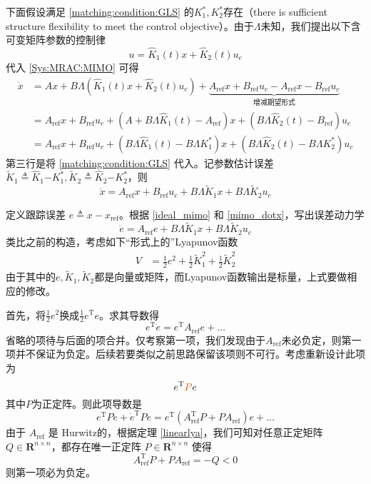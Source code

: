 下面假设满足 \eqref{matching:condition:GLS} 的$K^{\ast}_1, K^{\ast}_2$存在（there is sufficient structure flexibility to meet the control
objective）。由于$\Lambda$未知，我们提出以下含可变矩阵参数的控制律
\[ u = \hat{K}_1 (t) x + \hat{K}_2 (t) u_c \]
代入 \eqref{Sys:MRAC:MIMO} 可得
\begin{align}
    \dot{x}&=A  x + B \Lambda (\hat{K}_1 (t) x + \hat{K}_2 (t) u_c)+
    \underbrace{A_{\ensuremath{\operatorname{ref}}} x +
    B_{\ensuremath{\operatorname{ref}}} u_c-A_{\ensuremath{\operatorname{ref}}} x -
    B_{\ensuremath{\operatorname{ref}}} u_c}_{\text{增减期望形式}}\nonumber\\
    &=A_{\ensuremath{\operatorname{ref}}} x +
    B_{\ensuremath{\operatorname{ref}}} u_c+(A + B \Lambda \hat{K}_1 (t)-A_{\ensuremath{\operatorname{ref}}}) x+(B\Lambda\hat{K}_2 (t)-B_{\ensuremath{\operatorname{ref}}}) u_c\nonumber\\
    &=A_{\ensuremath{\operatorname{ref}}} x +
    B_{\ensuremath{\operatorname{ref}}} u_c+(B \Lambda \hat{K}_1 (t)-B \Lambda K^{\ast}_1) x+(B\Lambda\hat{K}_2 (t)-B \Lambda K^{\ast}_2) u_c\label{mimo_dotx}
\end{align}
第三行是将 \eqref{matching:condition:GLS} 代入。记参数估计误差 $\tilde{K}_1 \triangleq \hat{K}_1 {- K_1^{\ast}} , \tilde{K}_2
\triangleq \hat{K}_2 {- K_2^{\ast}} $，则
\[ \dot{x} = A_{\ensuremath{\operatorname{ref}}}  x +
   B_{\ensuremath{\operatorname{ref}}} u_c + B \Lambda  \tilde{K}_1 x + B
   \Lambda  \tilde{K}_2 u_c \]

定义跟踪误差 $e \triangleq x -
x_{\ensuremath{\operatorname{ref}}}$。根据 \eqref{ideal_mimo} 和 \eqref{mimo_dotx}，写出误差动力学
\begin{equation}
  \dot{e} = A_{\ensuremath{\operatorname{ref}}} e + B \Lambda  \tilde{K}_1 x +
  B \Lambda  \tilde{K}_2 u_c \label{errsys:MRAC:GLS}
\end{equation}
类比之前的构造，考虑如下“形式上的”Lyapunov函数
\begin{align*}
  V&=\frac12e^2+\frac{1}{2}\tilde{K}_1^2+\frac{1}{2}\tilde{K}_2^2
\end{align*}
由于其中的$e,\tilde{K}_1,\tilde{K}_2$都是向量或矩阵，而Lyapunov函数输出是标量，上式要做相应的修改。

首先，将$\frac12e^2$换成$\frac12e^\mathrm{T}e$。求其导数得\[e^\mathrm{T}\dot{e}=e^\mathrm{T}A_{\ensuremath{\operatorname{ref}}} e+\dots\]
省略的项待与后面的项合并。仅考察第一项，我们发现由于$A_{\ensuremath{\operatorname{ref}}}$未必负定，则第一项并不保证为负定。后续若要类似之前思路保留该项则不可行。考虑重新设计此项为\[e^\mathrm{T}\textcolor{second}{P}e\]
其中$P$为正定阵。则此项导数是
\[e^\mathrm{T}P\dot{e}+\dot{e}^\mathrm{T}Pe=e^\mathrm{T}(A_{\ensuremath{\operatorname{ref}}}^\mathrm{T} P + P A_{\ensuremath{\operatorname{ref}}}) e+\dots\]
由于 $A_{\ensuremath{\operatorname{ref}}}$ 是 Hurwitz的，根据定理 \ref{linearlya}，我们可知对任意正定矩阵 $Q \in \mathbf{R}^{n \times
n}$，都存在唯一正定阵 $P \in \mathbf{R}^{n \times n}$
使得
\[ A_{\ensuremath{\operatorname{ref}}}^\mathrm{T} P + P 
   A_{\ensuremath{\operatorname{ref}}} = - Q < 0 \]
则第一项必为负定。

